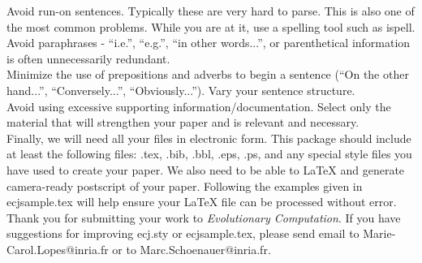 \documentclass[twoside]{article}
\begin{document}
Avoid run-on sentences.  Typically these are very hard to parse. This is 
also one of the most common problems. While you are at it, use a spelling 
tool such as ispell.\\

Avoid paraphrases - ``i.e.'', ``e.g.'', ``in other words...'', or 
parenthetical information is often unnecessarily redundant.\\

Minimize the use of prepositions and adverbs to begin a sentence (``On the other hand...'', ``Conversely...'', ``Obviously...'').  Vary your sentence 
structure.\\

Avoid using excessive supporting information/documentation.  Select only the 
material that will strengthen your paper and is relevant and necessary.\\

Finally, we will need all your files in electronic form.  This package should 
include at least the following files:  .tex, .bib, .bbl, .eps, .ps, and any 
special style files you have used to create your paper.  We also need to be 
able to LaTeX and generate camera-ready postscript of your paper. Following 
the examples given in ecjsample.tex will help ensure your LaTeX file can be 
processed without error.\\ 

Thank you for submitting your work to {\em Evolutionary Computation}.
If you have suggestions for improving ecj.sty or
ecjsample.tex, please send email to Marie-Carol.Lopes@inria.fr 
or to Marc.Schoenauer@inria.fr.

\small



\end{document}
